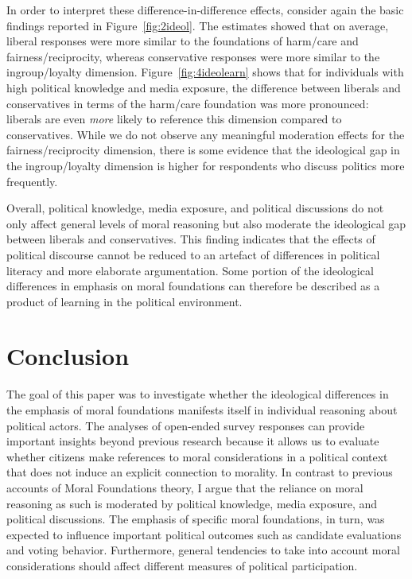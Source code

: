 \documentclass[12pt]{article}
\begin{document}
In order to interpret these difference-in-difference effects, consider again the basic findings reported in Figure~\ref{fig:2ideol}. The estimates showed that on average, liberal responses were more similar to the foundations of harm/care and fairness/reciprocity, whereas conservative responses were more similar to the ingroup/loyalty dimension. Figure~\ref{fig:4ideolearn} shows that for individuals with high political knowledge and media exposure, the difference between liberals and conservatives in terms of the harm/care foundation was more pronounced: liberals are even \textit{more} likely to reference this dimension compared to conservatives. While we do not observe any meaningful moderation effects for the fairness/reciprocity dimension, there is some evidence that the ideological gap in the ingroup/loyalty dimension is higher for respondents who discuss politics more frequently.

\clearpage
Overall, political knowledge, media exposure, and political discussions do not only affect general levels of moral reasoning but also moderate the ideological gap between liberals and conservatives. This finding indicates that the effects of political discourse cannot be reduced to an artefact of differences in political literacy and more elaborate argumentation. Some portion of the ideological differences in emphasis on moral foundations can therefore be described as a product of learning in the political environment.




\section{Conclusion}

The goal of this paper was to investigate whether the ideological differences in the emphasis of moral foundations manifests itself in individual reasoning about political actors. The analyses of open-ended survey responses can provide important insights beyond previous research because it allows us to evaluate whether citizens make references to moral considerations in a political context that does not induce an explicit connection to morality. In contrast to previous accounts of Moral Foundations theory, I argue that the reliance on moral reasoning as such is moderated by political knowledge, media exposure, and political discussions. The emphasis of specific moral foundations, in turn, was expected to influence important political outcomes such as candidate evaluations and voting behavior. Furthermore, general tendencies to take into account moral considerations should affect different measures of political participation.
\end{document}
